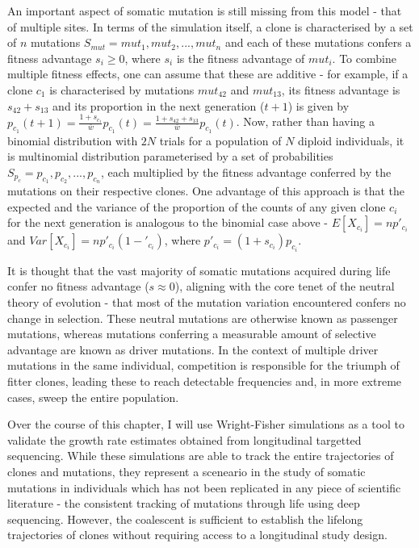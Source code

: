An important aspect of somatic mutation is still missing from this model - that of multiple sites. In terms of the simulation itself, a clone is characterised by a set of $n$ mutations $S_{mut} = {mut_1,mut_2,...,mut_n}$ and each of these mutations confers a fitness advantage $s_i \geq 0$, where $s_i$ is the fitness advantage of $mut_i$. To combine multiple fitness effects, one can assume that these are additive - for example, if a clone $c_1$ is characterised by mutations $mut_42$ and $mut_13$, its fitness advantage is $s_42 + s_13$ and its proportion in the next generation ($t+1$) is given by $p_{c_1}(t+1) = \frac{1+s_{c_1}}{\bar{w}}p_{c_1}(t) = \frac{1+s_{42}+s_{13}}{\bar{w}}p_{c_1}(t)$. Now, rather than having a binomial distribution with $2N$ trials for a population of $N$ diploid individuals, it is multinomial distribution parameterised by a set of probabilities $S_{p_c} = {p_{c_1},p_{c_2},...,p_{c_n}}$, each multiplied by the fitness advantage conferred by the mutations on their respective clones. One advantage of this approach is that the expected and the variance of the proportion of the counts of any given clone $c_i$ for the next generation is analogous to the binomial case above - $E[X_{c_i}] = np'_{c_i}$ and $Var[X_{c_i}] = np'_{c_i}(1-'_{c_i})$, where $p'_{c_i} = (1+s_{c_i})p_{c_i}$.

It is thought that the vast majority of somatic mutations acquired during life confer no fitness advantage ($s \approx 0$), aligning with the core tenet of the neutral theory of evolution - that most of the mutation variation encountered confers no change in selection. These neutral mutations are otherwise known as passenger mutations, whereas mutations conferring a measurable amount of selective advantage are known as driver mutations. In the context of multiple driver mutations in the same individual, competition is responsible for the triumph of fitter clones, leading these to reach detectable frequencies and, in more extreme cases, sweep the entire population.

Over the course of this chapter, I will use Wright-Fisher simulations as a tool to validate the growth rate estimates obtained from longitudinal targetted sequencing. While these simulations are able to track the entire trajectories of clones and mutations, they represent a sceneario in the study of somatic mutations in individuals which has not been replicated in any piece of scientific literature - the consistent tracking of mutations through life using deep sequencing. However, the coalescent is sufficient to establish the lifelong trajectories of clones without requiring access to a longitudinal study design.

